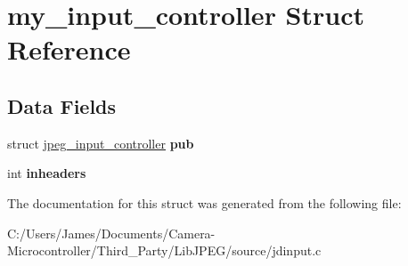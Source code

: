 \hypertarget{structmy__input__controller}{}\section{my\+\_\+input\+\_\+controller Struct Reference}
\label{structmy__input__controller}
\subsection*{Data Fields}
\begin{DoxyCompactItemize}
\item 
\mbox{\label{structmy__input__controller_add152a82c6931c268a9b8b354d31d978}} 
struct \hyperlink{structjpeg__input__controller}{jpeg\+\_\+input\+\_\+controller} {\bfseries pub}
\item 
\mbox{\label{structmy__input__controller_adb1858fb456d20a7761d1026db2e9a78}} 
int {\bfseries inheaders}
\end{DoxyCompactItemize}


The documentation for this struct was generated from the following file\+:\begin{DoxyCompactItemize}
\item 
C\+:/\+Users/\+James/\+Documents/\+Camera-\/\+Microcontroller/\+Third\+\_\+\+Party/\+Lib\+J\+P\+E\+G/source/jdinput.\+c\end{DoxyCompactItemize}
